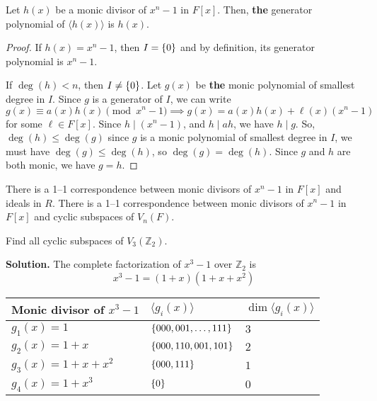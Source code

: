 \begin{Theorem}{}{}
    Let $ h(x) $ be a monic divisor of $ x^n-1 $ in $ F[x] $.
    Then, \textbf{the} generator polynomial of $ \langle h(x)\rangle $
    is $ h(x) $.
\end{Theorem}

\begin{proof}
    If $ h(x)=x^n-1 $, then $ I=\{0\} $ and by definition, its
    generator polynomial is $ x^n-1 $.

    If $ \deg(h)<n $, then $ I\neq \{0\} $. Let $ g(x) $
    be \textbf{the} monic polynomial of smallest degree in $ I $.
    Since $ g $ is a generator of $ I $, we can write
    \[ g(x)\equiv a(x)h(x)\pmod{x^n-1}\implies g(x)=a(x)h(x)+\ell(x)(x^n-1) \]
    for some $ \ell\in F[x] $. Since $ h\mid (x^n-1) $, and $ h\mid ah $,
    we have $ h\mid g $. So, $ \deg(h)\leqslant \deg(g) $ since
    $ g $ is a monic polynomial of smallest degree in $ I $,
    we must have $ \deg(g)\leqslant \deg(h) $, so $ \deg(g)=\deg(h) $.
    Since $ g $ and $ h $ are both monic, we have
    $ g=h $.
\end{proof}

\begin{Corollary}{}{}
    There is a 1--1 correspondence between monic
    divisors of $ x^n-1 $ in $ F[x] $ and ideals in $ R $.
    There is a 1--1 correspondence between monic
    divisors of $ x^n-1 $ in $ F[x] $ and cyclic
    subspaces of $ V_n(F) $.
\end{Corollary}

\begin{Example}{}{}
    Find all cyclic subspaces of $ V_3(\mathbb{Z}_2) $.

    \textbf{Solution.} The complete factorization
    of $ x^3-1 $ over $ \mathbb{Z}_2 $ is
    \[ x^3-1=(1+x)(1+x+x^2) \]

    \begin{table}[H]
        \centering
        \begin{tabularx}{0.8\linewidth}{@{}YYY@{}}
            Monic divisor of $ x^3-1 $ & $ \langle g_i(x) \rangle $    & $ \dim \langle g_i(x) \rangle $ \\
            \midrule
            \midrule
            $ g_1(x)=1 $               & $ \{000,001,\ldots ,111\} $ & $ 3 $                           \\
            \midrule
            $ g_2(x)=1+x $             & $ \{000,110,001,101\} $     & $ 2 $                           \\
            \midrule
            $ g_3(x)=1+x+x^2 $         & $ \{000,111\} $             & $ 1 $                           \\
            \midrule
            $ g_4(x)=1+x^3 $           & $ \{0\} $                   & $ 0 $                           \\
        \end{tabularx}
    \end{table}
\end{Example}

